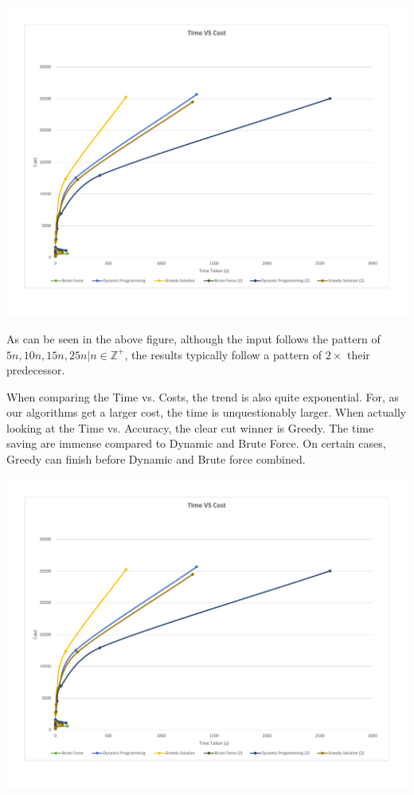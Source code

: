 \documentclass{article}
\begin{document}
\begin{adjustwidth}{-1.55cm}{}
    \centering
    \includegraphics[page=2,width=1.25\textwidth]{Graphs.pdf}
\end{adjustwidth}

As can be seen in the above figure, although the input follows the pattern of $5n, 10n, 15n, 25n | n \in \mathbb{Z}^+$, the results typically follow a pattern of $2\times$ their predecessor.

When comparing the Time vs. Costs, the trend is also quite exponential. For, as our algorithms get a larger cost, the time is unquestionably larger. When actually looking at the Time vs. Accuracy, the clear cut winner is Greedy. The time saving are immense compared to Dynamic and Brute Force. On certain cases, Greedy can finish before Dynamic and Brute force combined.

\begin{adjustwidth}{-1.55cm}{}
    \centering
    \includegraphics[page=1,width=1.25\textwidth]{Graphs.pdf}
\end{adjustwidth}
\end{document}
